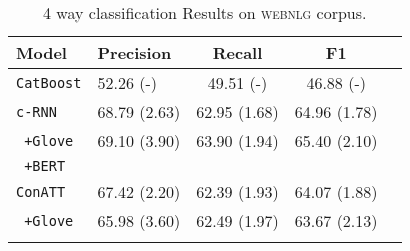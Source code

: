 \begin{table}[t!]
\small
\centering
\begin{tabular}{llccc}
\lsptoprule
Model & Precision & Recall & F1 \\ \midrule
\texttt{CatBoost} & 52.26 (-) & 49.51 (-) & 46.88 (-) \\ \midrule
\texttt{c-RNN} & 68.79 (2.63) & 62.95 (1.68) & 64.96 (1.78) \\
\texttt{ +Glove} & 69.10 (3.90) & 63.90 (1.94) & 65.40 (2.10) \\
\texttt{ +BERT} \\
\texttt{ConATT} & 67.42 (2.20) & 62.39 (1.93) & 64.07 (1.88) \\
\texttt{ +Glove} & 65.98 (3.60) & 62.49 (1.97) & 63.67 (2.13) \\
\lspbottomrule
\end{tabular}
\caption{4 way classification Results on \textsc{webnlg} corpus.}
\label{tab:cls1}
\end{table}
